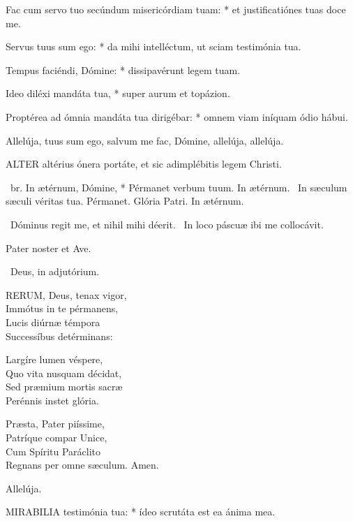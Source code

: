 Fac cum servo tuo secúndum misericórdiam tuam: * et justificatiónes tuas doce me.

Servus tuus sum ego: * da mihi intelléctum, ut sciam testimónia tua.

Tempus faciéndi, Dómine: * dissipavérunt legem tuam.

Ideo diléxi mandáta tua, * super aurum et topázion.

Proptérea ad ómnia mandáta tua dirigébar: * omnem viam iníquam ódio hábui.

 Allelúja, tuus sum ego, salvum me fac, Dómine, allelúja, allelúja.


\lettrine[lines=2]{A}{LTER} altérius ónera portáte, et sic adimplébitis legem Christi.

\R\ br. In ætérnum, Dómine, * Pérmanet verbum tuum. In ætérnum. \V\ In sæculum sæculi véritas tua. Pérmanet. Glória Patri. In ætérnum.

\V\ Dóminus regit me, et nihil mihi déerit. \R\ In loco páscuæ ibi me collocávit.



Pater noster et Ave.

\V\ Deus, in adjutórium.


\lettrine[lines=2]{R}{ERUM}, Deus, tenax vigor,\\
Immótus in te pérmanens,\\
Lucis diúrnæ témpora\\
Successíbus detérminans:

Largíre lumen véspere,\\
Quo vita nusquam décidat,\\
Sed præmium mortis sacræ\\
Perénnis instet glória.

Præsta, Pater piíssime,\\
Patríque compar Unice,\\
Cum Spíritu Paráclito\\
Regnans per omne sæculum. Amen.

 Allelúja.


\lettrine[lines=2]{M}{IRABILIA} testimónia tua: * ídeo scrutáta est ea ánima mea.

